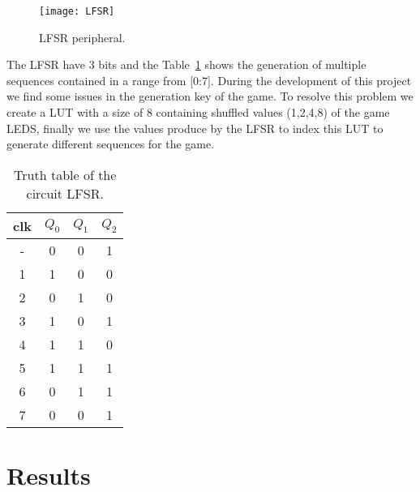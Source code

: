 \vspace{10pt}
\begin{figure}[!htbp]
    \centerline{\texttt{[image: LFSR]}}
    \vspace{0cm}\caption{LFSR peripheral.}
    \label{fig:LFSR}
\end{figure}

\noindent The LFSR have 3 bits and the Table~\ref{tab:LFSR} shows the generation of multiple sequences contained in 
a range from [0:7]. During the development of this project we find some issues in the generation key of the game.
To resolve this problem we create a LUT with a size of 8 containing shuffled values (1,2,4,8) of the game LEDS,
finally we use the values produce by the LFSR to index this LUT to generate different sequences for the game.

\begin{table}[!htbp]
\centering
    \begin{tabular}{c|ccc}
        clk & $Q_0$ & $Q_1$ & $Q_2$ \\
        \hline
        - & 0 & 0 & 1 \\
        1 & 1 & 0 & 0 \\
        2 & 0 & 1 & 0 \\
        3 & 1 & 0 & 1 \\
        4 & 1 & 1 & 0 \\
        5 & 1 & 1 & 1 \\
        6 & 0 & 1 & 1 \\
        7 & 0 & 0 & 1 \\   
    \end{tabular}
    \caption{Truth table of the circuit LFSR.}
    \label{tab:LFSR}
\end{table} 

\clearpage
\section{Results}
\label{sec:results}

